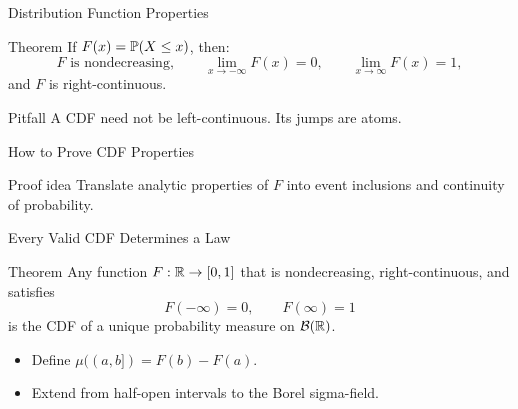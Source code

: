 \begin{frame}{Distribution Function Properties}
  \begin{block}{Theorem}
    If $F(x)=\mathbb{P}(X\le x)$, then:
    \[
      F \text{ is nondecreasing},\qquad
      \lim_{x\to-\infty}F(x)=0,\qquad
      \lim_{x\to\infty}F(x)=1,
    \]
    and $F$ is right-continuous.
  \end{block}
  \begin{alertblock}{Pitfall}
    A CDF need not be left-continuous. Its jumps are atoms.
  \end{alertblock}
\end{frame}

\begin{frame}{How to Prove CDF Properties}
  \begin{block}{Proof idea}
    Translate analytic properties of $F$ into event inclusions and continuity of probability.
  \end{block}
\end{frame}

\begin{frame}{Every Valid CDF Determines a Law}
  \begin{block}{Theorem}
    Any function $F:\mathbb{R}\to[0,1]$ that is nondecreasing, right-continuous, and satisfies
    \[
      F(-\infty)=0,\qquad F(\infty)=1
    \]
    is the CDF of a unique probability measure on $\mathcal{B}(\mathbb{R})$.
  \end{block}
  \begin{itemize}
    \item Define $\mu((a,b])=F(b)-F(a)$.
    \item Extend from half-open intervals to the Borel sigma-field.
  \end{itemize}
\end{frame}


